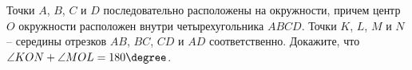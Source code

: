 \begin{ex}
	\begin{condition}
		Точки \( A \), \( B \), \( C  \) и \( D  \) последовательно расположены	на окружности, причем центр \( O  \) окружности расположен внутри четырехугольника \( ABCD \). Точки \( K \), \( L \), \( M  \) и \( N \) – середины отрезков \( AB \), \( BC \), \( CD  \) и \( AD  \) соответственно. Докажите, что \( \angle KON + \angle MOL = 180\degree \).
	\end{condition}
\end{ex}